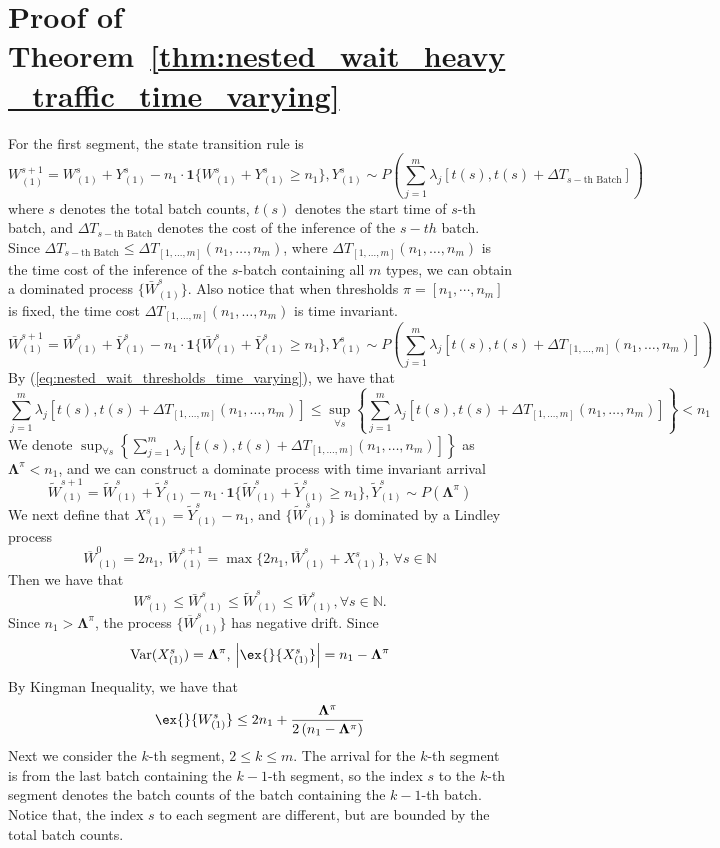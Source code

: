 \section{Proof of Theorem~\ref{thm:nested_wait_heavy_traffic_time_varying}}\label{appendix:: proof of nested optimality, time varying.}
For the first segment, the state transition rule is 
$$ W_{(1)}^{s+1} = W_{(1)}^{s} + Y_{(1)}^s  - n_1 \cdot \mathbf{1}\{ W_{(1)}^{s} + Y_{(1)}^s \geq n_1 \},  Y_{(1)}^s \sim P( \sum_{j=1}^m \lambda_j[t(s), t(s)+ \Delta T_{s-\text{th Batch}}] )  $$
where $s$ denotes the total batch counts, $t(s)$ denotes the start time of $s$-th batch, and $\Delta T_{s-\text{th Batch}}$ denotes the cost of the inference of the $s-th$ batch. Since $\Delta T_{s-\text{th Batch}}\leq \Delta T_{[1,\dots,m]}(n_1,\dots,n_m)$, where $\Delta T_{[1,\dots,m]}(n_1,\dots,n_m)$ is the time cost of the inference of the $s$-batch containing all $m$ types, we can obtain a dominated process $\{\bar{W}_{(1)}^{s}\}$. Also notice that when thresholds $\pi = [n_1, \cdots,n_m]$ is fixed, the time cost $\Delta T_{[1,\dots,m]}(n_1,\dots,n_m)$ is time invariant.
$$ \bar{W}_{(1)}^{s+1} = \bar{W}_{(1)}^{s} + \bar{Y}_{(1)}^s  - n_1 \cdot \mathbf{1}\{ \bar{W}_{(1)}^{s} + \bar{Y}_{(1)}^s \geq n_1 \},  Y_{(1)}^s \sim P(  \sum_{j=1}^m \lambda_j[t(s), t(s)+\Delta T_{[1,\dots,m]}(n_1,\dots,n_m)] )  $$
By (\ref{eq:nested_wait_thresholds_time_varying}), we have that
$$ \sum_{j=1}^m \lambda_j[t(s), t(s)+\Delta T_{[1,\dots,m]}(n_1,\dots,n_m)] \leq \sup_{\forall s}\left\{\sum_{j=1}^m \lambda_j[t(s), t(s)+\Delta T_{[1,\dots,m]}(n_1,\dots,n_m)] \right\} < n_1$$
We denote $\sup_{\forall s}\left\{\sum_{j=1}^m \lambda_j[t(s), t(s)+\Delta T_{[1,\dots,m]}(n_1,\dots,n_m)] \right\}$ as $\mathbf{\Lambda}^{\pi}<n_1$, and we can construct a dominate process with time invariant arrival
$$ \tilde{W}_{(1)}^{s+1} = \tilde{W}_{(1)}^{s} + \tilde{Y}_{(1)}^s  - n_1 \cdot \mathbf{1}\{ \tilde{W}_{(1)}^{s} + \tilde{Y}_{(1)}^s \geq n_1 \},  \tilde{Y}_{(1)}^s \sim P(\mathbf{\Lambda}^{\pi})  $$
We next define that $X_{(1)}^s = \tilde{Y}_{(1)}^s - n_1  $, and $\{ \tilde{W}_{(1)}^{s}\}$ is dominated by a Lindley process
$$ \overline{W}_{(1)}^{0} = 2n_1,\,  \overline{W}_{(1)}^{s+1} = \max \{  2n_1, \overline{W}_{(1)}^{s} + X_{(1)}^s \},\,\forall s \in \mathbb{N} $$
Then we have that
$$ W_{(1)}^{s}\leq \bar{W}_{(1)}^{s} \leq \tilde{W}_{(1)}^{s} \leq \overline{W}_{(1)}^{s}, \forall s \in \mathbb{N}.$$
Since $n_1> \mathbf{\Lambda}^{\pi}$, the process $\{\overline{W}_{(1)}^{s} \}$ has negative drift. Since 
$$\text{Var}(X_{(1)}^s ) = \mathbf{\Lambda}^{\pi},\,\left|  \ex{}{X_{(1)}^s} \right| = n_1 - \mathbf{\Lambda}^{\pi}$$
By Kingman Inequality, we have that
$$  \ex{}{W_{(1)}^s}\leq  2n_1 + \frac{\mathbf{\Lambda}^{\pi}}{2\left(n_1 -\mathbf{\Lambda}^{\pi}\right)} $$
Next we consider the $k$-th segment, $2\leq k\leq m$. The arrival for the $k$-th segment is from the last batch containing the $k-1$-th segment, so the index $s$ to the $k$-th segment denotes the batch counts of the batch containing the $k-1$-th batch. Notice that, the index $s$ to each segment are different, but are bounded by the total batch counts. 

